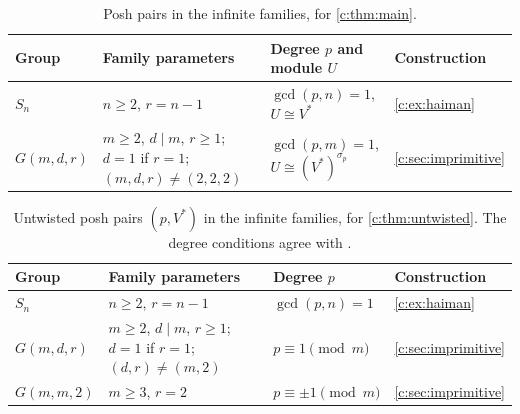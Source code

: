 \documentclass[11pt]{amsart}
\theoremstyle{definition}
\begin{document}
\begin{table}[htbp]
\centering
\begin{tabular}{@{}L{.14\textwidth}L{.29\textwidth}L{.30\textwidth}L{.19\textwidth}@{}}
\toprule
Group & Family parameters & Degree $p$ and module $U$ & Construction\\
\midrule
$S_n$ & $n\ge2$, $r=n-1$ & $\gcd(p,n)=1$,\newline $U\cong V^*$ & \cref{c:ex:haiman}\\
\addlinespace
$G(m,d,r)$ & $m\ge2$, $d\mid m$, $r\ge1$;\newline $d=1$ if $r=1$;\newline $(m,d,r)\ne(2,2,2)$ & $\gcd(p,m)=1$,\newline $U\cong(V^*)^{\sigma_p}$ & \cref{c:sec:imprimitive}\\
\bottomrule
\end{tabular}
\caption{Posh pairs in the infinite families, for \cref{c:thm:main}.} %
\label{tab:infinite-algebraic}
\end{table}

\begin{table}[htbp]
\centering
\begin{tabular}{@{}L{.17\textwidth}L{.35\textwidth}L{.20\textwidth}L{.20\textwidth}@{}}
\toprule
Group & Family parameters & Degree $p$ & Construction\\
\midrule
$S_n$ & $n\ge2$, $r=n-1$ & $\gcd(p,n)=1$ & \cref{c:ex:haiman}\\
\addlinespace
$G(m,d,r)$ & $m\ge2$, $d\mid m$, $r\ge1$;\newline $d=1$ if $r=1$;\newline $(d,r)\ne(m,2)$ & $p\equiv1\pmod m$ & \cref{c:sec:imprimitive}\\
\addlinespace
$G(m,m,2)$ & $m\ge3$, $r=2$ & $p\equiv\pm1\pmod m$ & \cref{c:sec:imprimitive}\\
\bottomrule
\end{tabular}
\caption{Untwisted posh pairs $(p,V^*)$ in the infinite
families, for \cref{c:thm:untwisted}. %
The degree conditions agree with \cite[Table 1]{IO}.}
\label{tab:infinite-untwisted}
\end{table}
\end{document}
